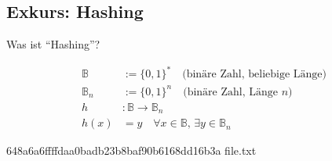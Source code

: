 \subsection{Exkurs: Hashing}\label{subsec:exkurs:-hashing}

\begin{frame}[c]
    \slidehead
    \Huge
    \centering
    Was ist \enquote{Hashing}?
\end{frame}

\begin{frame}[c]
    \slidehead
    \centering
    {
        \Large
    }
    \begin{align*}
        \mathbb{B} &:= \{0, 1\}^* \quad \text{(binäre Zahl, beliebige Länge)} \\
        \mathbb{B}_n &:= \{0, 1\}^n \quad \text{(binäre Zahl, Länge $n$)} \\
        h &: \mathbb{B} \rightarrow \mathbb{B}_n \\
        h(x) &= y \quad \forall x \in \mathbb{B}, \, \exists y \in \mathbb{B}_n
    \end{align*}
\end{frame}

\begin{frame}[c, fragile]
    \slidehead
    \centering
    \begin{codeBlock}[]{}
        648a6a6ffffdaa0badb23b8baf90b6168dd16b3a  file.txt
    \end{codeBlock}
\end{frame}

\begin{frame}[c]
    \slidehead
    \centering
    {
        \Large
    }
\end{frame}
